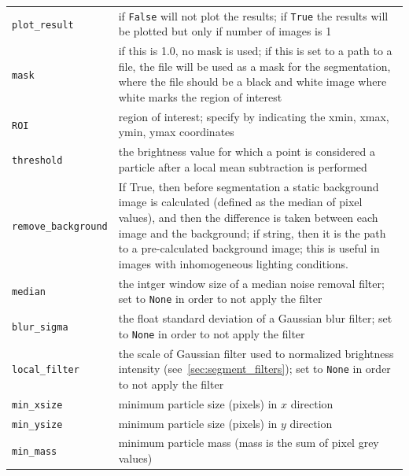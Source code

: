 \documentclass[10pt,a4paper]{article}
\begin{document}
\begin{table}[!ht]
\begin{tabular}{l m{13cm}}
		\texttt{plot\_result} & if \texttt{False} will not plot the results; if \texttt{True} the results will be plotted but only if number of images is 1 \\[.3em]
		
		\texttt{mask} & if this is 1.0, no mask is used; if this is set to a path to a file, the file will be used as a mask for the segmentation, where the file should be a black and white image where white marks the region of interest \\[.3em]
		
		\texttt{ROI} & region of interest; specify by indicating the xmin, xmax, ymin, ymax coordinates \\[.3em]
		
		\texttt{threshold} & the brightness value for which a point is considered a particle after a local mean subtraction is performed \\[.5em]
		
		\texttt{remove\_background} & If True, then before segmentation a static background image is calculated (defined as the median of pixel values), and then the difference is taken between each image and the background; if string, then it is the path to a pre-calculated background image; this is useful in images with inhomogeneous lighting conditions. \\[.5em]
		
		\texttt{median} & the intger window size of a median noise removal filter; set to \texttt{None} in order to not apply the filter \\[.3em]
		
		\texttt{blur\_sigma} & the float standard deviation of a Gaussian blur filter; set to \texttt{None} in order to not apply the filter \\[.3em]
		
		\texttt{local\_filter} & the scale of Gaussian filter used to normalized brightness intensity (see~\ref{sec:segment_filters}); set to \texttt{None} in order to not apply the filter \\[.3em]
		
		\texttt{min\_xsize} & minimum particle size (pixels) in $x$ direction \\[.3em]
		
		\texttt{min\_ysize} & minimum particle size (pixels) in $y$ direction \\[.3em]
		
		\texttt{min\_mass} & minimum particle mass (mass is the sum of pixel grey values)\\[.3em]
		

\end{tabular}
\end{table}
\end{document}
